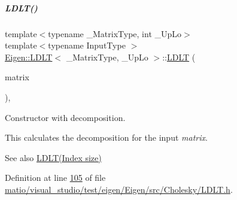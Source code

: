 \mbox{\label{group___cholesky___module_ad0e8d2131ea1a626a08d98e9effb1cc5}} 
\subparagraph{\texorpdfstring{L\+D\+L\+T()}{LDLT()}\hspace{0.1cm}{\footnotesize\ttfamily [7/8]}}
{\footnotesize\ttfamily template$<$typename \+\_\+\+Matrix\+Type, int \+\_\+\+Up\+Lo$>$ \\
template$<$typename Input\+Type $>$ \\
\hyperlink{group___cholesky___module_class_eigen_1_1_l_d_l_t}{Eigen\+::\+L\+D\+LT}$<$ \+\_\+\+Matrix\+Type, \+\_\+\+Up\+Lo $>$\+::\hyperlink{group___cholesky___module_class_eigen_1_1_l_d_l_t}{L\+D\+LT} (\begin{DoxyParamCaption}\item[{const \hyperlink{group___core___module_struct_eigen_1_1_eigen_base}{Eigen\+Base}$<$ Input\+Type $>$ \&}]{matrix }\end{DoxyParamCaption})\hspace{0.3cm}{\ttfamily [inline]}, {\ttfamily [explicit]}}



Constructor with decomposition. 

This calculates the decomposition for the input {\itshape matrix}.

\begin{DoxySeeAlso}{See also}
\hyperlink{group___cholesky___module_a154aa41bd2460199d48861eaf5e4f597}{L\+D\+L\+T(\+Index size)} 
\end{DoxySeeAlso}


Definition at line \hyperlink{matio_2visual__studio_2test_2eigen_2_eigen_2src_2_cholesky_2_l_d_l_t_8h_source_l00105}{105} of file \hyperlink{matio_2visual__studio_2test_2eigen_2_eigen_2src_2_cholesky_2_l_d_l_t_8h_source}{matio/visual\+\_\+studio/test/eigen/\+Eigen/src/\+Cholesky/\+L\+D\+L\+T.\+h}.

